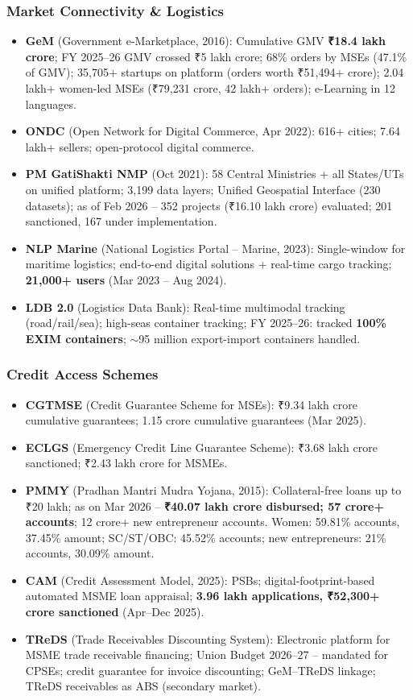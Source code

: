 \subsubsection*{Market Connectivity \& Logistics}
\begin{itemize}
  \item \textbf{GeM} (Government e-Marketplace, 2016): Cumulative GMV \textbf{₹18.4 lakh crore}; FY 2025--26 GMV crossed ₹5 lakh crore; 68\% orders by MSEs (47.1\% of GMV); 35,705+ startups on platform (orders worth ₹51,494+ crore); 2.04 lakh+ women-led MSEs (₹79,231 crore, 42 lakh+ orders); e-Learning in 12 languages.
  \item \textbf{ONDC} (Open Network for Digital Commerce, Apr 2022): 616+ cities; 7.64 lakh+ sellers; open-protocol digital commerce.
  \item \textbf{PM GatiShakti NMP} (Oct 2021): 58 Central Ministries + all States/UTs on unified platform; 3,199 data layers; Unified Geospatial Interface (230 datasets); as of Feb 2026 -- 352 projects (₹16.10 lakh crore) evaluated; 201 sanctioned, 167 under implementation.
  \item \textbf{NLP Marine} (National Logistics Portal -- Marine, 2023): Single-window for maritime logistics; end-to-end digital solutions + real-time cargo tracking; \textbf{21,000+ users} (Mar 2023 -- Aug 2024).
  \item \textbf{LDB 2.0} (Logistics Data Bank): Real-time multimodal tracking (road/rail/sea); high-seas container tracking; FY 2025--26: tracked \textbf{100\% EXIM containers}; $\sim$95 million export-import containers handled.
\end{itemize}

\subsubsection*{Credit Access Schemes}
\begin{itemize}
  \item \textbf{CGTMSE} (Credit Guarantee Scheme for MSEs): ₹9.34 lakh crore cumulative guarantees; 1.15 crore cumulative guarantees (Mar 2025).
  \item \textbf{ECLGS} (Emergency Credit Line Guarantee Scheme): ₹3.68 lakh crore sanctioned; ₹2.43 lakh crore for MSMEs.
  \item \textbf{PMMY} (Pradhan Mantri Mudra Yojana, 2015): Collateral-free loans up to ₹20 lakh; as on Mar 2026 -- \textbf{₹40.07 lakh crore disbursed; 57 crore+ accounts}; 12 crore+ new entrepreneur accounts. Women: 59.81\% accounts, 37.45\% amount; SC/ST/OBC: 45.52\% accounts; new entrepreneurs: 21\% accounts, 30.09\% amount.
  \item \textbf{CAM} (Credit Assessment Model, 2025): PSBs; digital-footprint-based automated MSME loan appraisal; \textbf{3.96 lakh applications, ₹52,300+ crore sanctioned} (Apr--Dec 2025).
  \item \textbf{TReDS} (Trade Receivables Discounting System): Electronic platform for MSME trade receivable financing; Union Budget 2026--27 -- mandated for CPSEs; credit guarantee for invoice discounting; GeM--TReDS linkage; TReDS receivables as ABS (secondary market).
\end{itemize}

